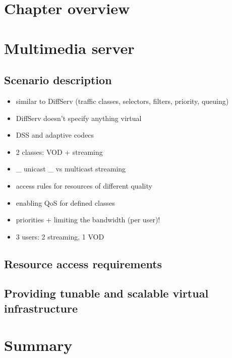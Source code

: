 \documentclass[11pt]{book}
\begin{document}
    \section*{Chapter overview}


    \section{Multimedia server}

      \subsection{Scenario description}

        \begin{itemize}
          \item similar to DiffServ (traffic classes, selectors, filters, priority, queuing)
          \item DiffServ doesn't specify anything virtual
          \item DSS and adaptive codecs
        \end{itemize}

        \begin{itemize}
          \item 2 classes: VOD + streaming
          \item \_ unicast \_ vs multicast streaming
          \item access rules for resources of different quality
          \item enabling QoS for defined classes
          \item priorities + limiting the bandwidth (per user)!
          \item 3 users: 2 streaming, 1 VOD
        \end{itemize}


      \subsection{Resource access requirements}

      \subsection{Providing tunable and scalable virtual infrastructure}


    \section*{Summary}
\end{document}
